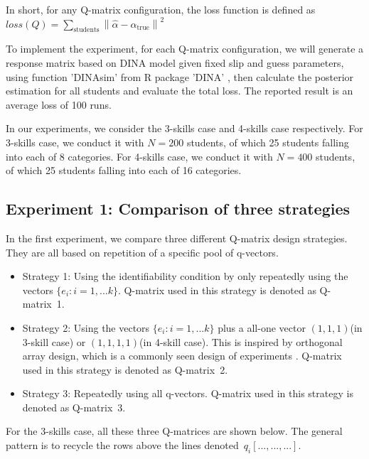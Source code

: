 \documentclass{edm_template}
\begin{document}
In short, for any Q-matrix configuration, the loss function is defined as
\newcommand\norm[1]{\left\lVert#1\right\rVert}
$ loss(Q) = \sum_{\mathrm{students}} \norm{\hat{\alpha} - \alpha_{\mathrm{true}}}^2$ 

To implement the experiment, for each Q-matrix configuration, we will generate a response matrix based on DINA model given fixed slip and guess parameters, using function 'DINAsim' from R package 'DINA' \cite{Culpepper2015}, then calculate the posterior estimation for all students and evaluate the total loss. The reported result is an average loss of 100 runs. 

In our experiments, we consider the 3-skills case and 4-skills case respectively. For 3-skills case, we conduct it with $N=200$ students, of which 25 students falling into each of 8 categories. For 4-skills case, we conduct it with $N=400$ students, of which 25 students falling into each of 16 categories. 

\subsection{Experiment 1: Comparison of three strategies}
In the first experiment, we compare three different Q-matrix design strategies. They are all based on repetition of a specific pool of q-vectors.
\begin{itemize}
\item Strategy 1: Using the identifiability condition by only repeatedly using the vectors $\{e_{i}:i=1,...k\}$. Q-matrix used in this strategy is denoted as Q-matrix~1.
\item Strategy 2: Using the vectors $\{e_{i}:i=1,...k\}$ plus a all-one vector $(1,1,1)$(in 3-skill case) or $(1,1,1,1)$(in 4-skill case). This is inspired by orthogonal array design, which is a commonly seen design of experiments \cite{montgomery2017design}. Q-matrix used in this strategy is denoted as Q-matrix~2.
\item Strategy 3: Repeatedly using all q-vectors. Q-matrix used in this strategy is denoted as Q-matrix~3.
\end{itemize}
For the 3-skills case, all these three Q-matrices are shown below. The general pattern is to recycle the rows above the lines denoted~$q_i [..., ..., ...]$.
\end{document}
